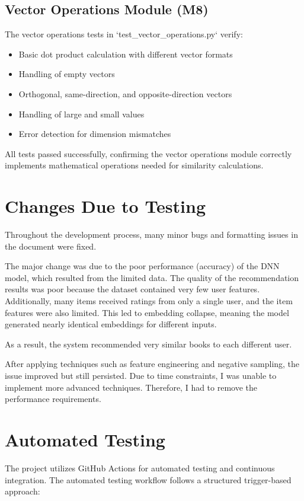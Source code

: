 \documentclass[12pt, titlepage]{article}
\begin{document}
\subsection{Vector Operations Module (M8)}
The vector operations tests in `test\_vector\_operations.py` verify:
\begin{itemize}
    \item Basic dot product calculation with different vector formats
    \item Handling of empty vectors
    \item Orthogonal, same-direction, and opposite-direction vectors
    \item Handling of large and small values
    \item Error detection for dimension mismatches
\end{itemize}

All tests passed successfully, confirming the vector operations module correctly implements mathematical operations needed for similarity calculations.

\section{Changes Due to Testing}

Throughout the development process, many minor bugs and formatting issues in the document were fixed.

The major change was due to the poor performance (accuracy) of the DNN model, which resulted from the limited data. The quality of the recommendation results was poor because the dataset contained very few user features. Additionally, many items received ratings from only a single user, and the item features were also limited. This led to embedding collapse, meaning the model generated nearly identical embeddings for different inputs.

As a result, the system recommended very similar books to each different user.

After applying techniques such as feature engineering and negative sampling, the issue improved but still persisted. Due to time constraints, I was unable to implement more advanced techniques. Therefore, I had to remove the performance requirements.

\section{Automated Testing}

The project utilizes GitHub Actions for automated testing and continuous integration. The automated testing workflow follows a structured trigger-based approach:
\end{document}
